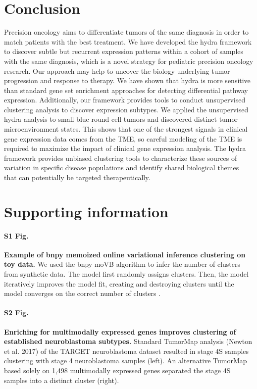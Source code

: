 \documentclass[10pt,letterpaper]{article}
\begin{document}
\section*{Conclusion}
Precision oncology aims to differentiate tumors of the same diagnosis in order to match patients with the best treatment. We have developed the hydra framework to discover subtle but recurrent expression patterns within a cohort of samples with the same diagnosis, which is a novel strategy for pediatric precision oncology research. Our approach may help to uncover the biology underlying tumor progression and response to therapy. We have shown that hydra is more sensitive than standard gene set enrichment approaches for detecting differential pathway expression. Additionally, our framework provides tools to conduct unsupervised clustering analysis to discover expression subtypes. We applied the unsupervised hydra analysis to small blue round cell tumors and discovered distinct tumor microenvironment states. This shows that one of the strongest signals in clinical gene expression data comes from the TME, so careful modeling of the TME is required to maximize the impact of clinical gene expression analysis. The hydra framework provides unbiased clustering tools to characterize these sources of variation in specific disease populations and identify shared biological themes that can potentially be targeted therapeutically.

\section*{Supporting information}

\paragraph*{S1 Fig.}
\label{S1_Fig}
{\bf Example of bnpy memoized online variational inference clustering on toy data.} We used the bnpy moVB algorithm to infer the number of clusters from synthetic data. The model first randomly assigns clusters. Then, the model iteratively improves the model fit, creating and destroying clusters until the model converges on the correct number of clusters \cite{hughesBnpyReliableScalable}. 

\paragraph*{S2 Fig.}
\label{S2_Fig}
{\bf Enriching for multimodally expressed genes improves clustering of established neuroblastoma subtypes.} Standard TumorMap analysis (Newton et al. 2017) of the TARGET neuroblastoma dataset resulted in stage 4S samples clustering with stage 4 neuroblastoma samples (left). An alternative TumorMap based solely on 1,498 multimodally expressed genes separated the stage 4S samples into a distinct cluster (right).
\end{document}
